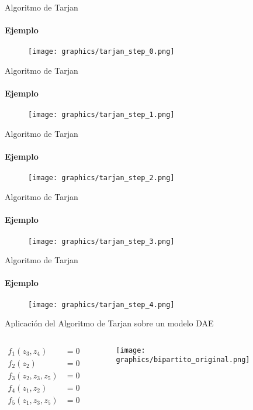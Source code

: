 \begin{frame}{Algoritmo de Tarjan}
    \framesubtitle{Ejemplo}
    \begin{figure}
        \texttt{[image: graphics/tarjan\_step\_0.png]}
    \end{figure}
\end{frame}

\begin{frame}{Algoritmo de Tarjan}
    \framesubtitle{Ejemplo}
    \begin{figure}
        \texttt{[image: graphics/tarjan\_step\_1.png]}
    \end{figure}
\end{frame}

\begin{frame}{Algoritmo de Tarjan}
    \framesubtitle{Ejemplo}
    \begin{figure}
        \texttt{[image: graphics/tarjan\_step\_2.png]}
    \end{figure}
\end{frame}

\begin{frame}{Algoritmo de Tarjan}
    \framesubtitle{Ejemplo}
    \begin{figure}
        \texttt{[image: graphics/tarjan\_step\_3.png]}
    \end{figure}
\end{frame}

\begin{frame}{Algoritmo de Tarjan}
    \framesubtitle{Ejemplo}
    \begin{figure}
        \texttt{[image: graphics/tarjan\_step\_4.png]}
    \end{figure}
\end{frame}


\begin{frame}[fragile]{Aplicación del Algoritmo de Tarjan sobre un modelo DAE}
    \begin{columns}
        \begin{column}{0.5\textwidth}
          \centering
          \begin{align*}
            f_1(z_3,z_4) &= 0 \\
            f_2(z_2) &= 0 \\
            f_3(z_2,z_3,z_5) &= 0 \\
            f_4(z_1,z_2) &= 0 \\
            f_5(z_1,z_3,z_5) &= 0 \\
          \end{align*}
        \end{column}
        \begin{column}{0.5\textwidth}
        \begin{figure}
           \centering
           \texttt{[image: graphics/bipartito\_original.png]}
        \end{figure}
        \end{column}
    \end{columns}
\end{frame}

